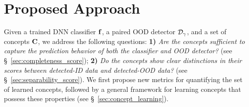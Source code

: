 \vspace{-.05in}
\section{Proposed Approach}
Given a trained DNN classifier $\mathbf{f}$, a paired OOD detector $\mathcal{D}_\gamma$, and a set of concepts $\mathbf{C}$, we address the following questions: \textbf{1)} \emph{Are the concepts sufficient to capture the prediction behavior of both the classifier and OOD detector?} (see \S~\ref{sec:completeness_score}); \textbf{2)} \emph{Do the concepts show clear distinctions in their scores between detected-ID data and detected-OOD data?} (see \S~\ref{sec:separability_score}). 
We first propose new metrics for quantifying the set of learned concepts, followed by a general framework for learning concepts that possess these properties (see \S~\ref{sec:concept_learning}).

